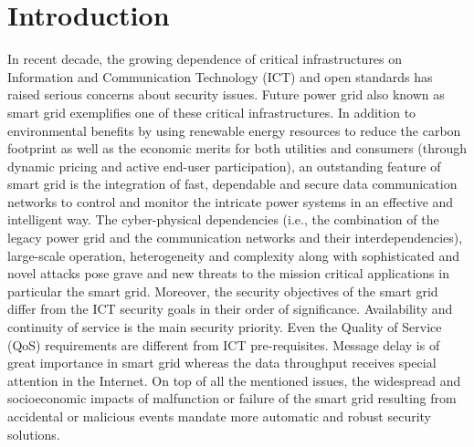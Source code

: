 \documentclass[preprint,number,12pt]{elsarticle}
\begin{document}
\section{Introduction}
\label{introduction}
In recent decade, the growing dependence of critical infrastructures on Information and Communication Technology (ICT) and open standards has raised serious concerns about security issues. Future power grid also known as smart grid exemplifies one of these critical infrastructures. In addition to environmental benefits by using renewable energy resources to reduce the carbon footprint as well as the economic merits for both utilities and consumers (through dynamic pricing and active end-user participation), an outstanding feature of smart grid is the integration of fast, dependable and secure data communication networks to control and monitor the intricate power systems in an effective and intelligent way\citep{Wang20113604}. The cyber-physical dependencies (i.e., the combination of the legacy power grid and the communication networks and their interdependencies)\citep{Chen2012}, large-scale operation, heterogeneity and complexity\citep{Mo2012,Amin2005,Liu2012a} along with sophisticated and novel attacks pose grave and new threats to the mission critical applications in particular the smart grid. Moreover, the security objectives of the smart grid differ from the ICT security goals in their order of significance. Availability and continuity of service is the main security priority\citep{Liu2012}. Even the Quality of Service (QoS) requirements are different from ICT pre-requisites. Message delay is of great importance in smart grid whereas the data throughput receives special attention in the Internet\citep{Yan2012}. On top of all the mentioned issues, the widespread and socioeconomic impacts of malfunction or failure of the smart grid resulting from accidental or malicious events mandate more automatic and robust security solutions\citep{Verissimo2006,Bessani2008c}.
\end{document}
